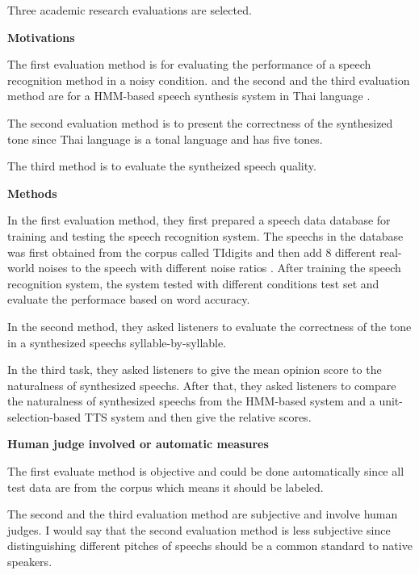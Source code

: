 \documentclass[12pt]{article}
\newenvironment{problem}[2][Problem]{\begin{trivlist}
\item[\hskip \labelsep {\bfseries #1}\hskip \labelsep {\bfseries #2.}]}{\end{trivlist}}
\begin{document}
\begin{problem}{5.3}
    Three academic research evaluations are selected. 
    
\noindent\textbf{Motivations}

    The first evaluation method is for evaluating the performance of a speech recognition 
    method in a noisy condition. \cite{hirsch2000aurora} and 
    the second and the third evaluation method are for a HMM-based speech synthesis system 
    in Thai language \cite{chomphan2007implementation}. 
    
    The second evaluation method is to present the correctness of the synthesized
    tone since Thai language is a tonal language and has five tones.
    
    The third method is to evaluate the syntheized speech quality.

\noindent\textbf{Methods}

    In the first evaluation method, they first prepared a speech data database 
    for training and testing the speech recognition system.
    The speechs in the database was first obtained from 
    the corpus called TIdigits and then add 8 different real-world noises to 
    the speech with different noise ratios \cite{hirsch2000aurora}.
    After training the speech recognition system, the system tested with different
    conditions test set and evaluate the performace based on word accuracy.

    In the second method, they asked listeners to evaluate the correctness of the 
    tone in a synthesized speechs syllable-by-syllable. \cite{tone_questions} 
    
    In the third task, they asked listeners to give the mean opinion score to 
    the naturalness of synthesized speechs. After that, they asked listeners
    to compare the naturalness of synthesized speechs from the HMM-based system and 
    a unit-selection-based TTS system and then give the relative scores.    

\noindent\textbf{Human judge involved or automatic measures}
    
    The first evaluate method is objective and could be done automatically since
    all test data are from the corpus which means it should be labeled.

    The second and the third evaluation method are subjective and involve human judges.
    I would say that the second evaluation method is less subjective since 
    distinguishing different pitches of speechs should be a common standard to
    native speakers.


\end{problem}
\end{document}
